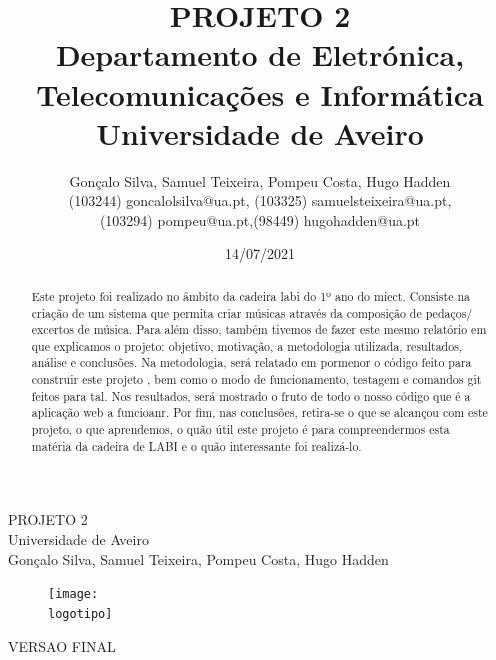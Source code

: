 \documentclass{report}
\begin{document}
%
\def\titulo{PROJETO 2}
\def\data{14/07/2021}
\def\autores{Gonçalo Silva, Samuel Teixeira, Pompeu Costa, Hugo Hadden}
\def\autorescontactos{(103244) goncalolsilva@ua.pt, (103325) samuelsteixeira@ua.pt,\\
 (103294) pompeu@ua.pt,(98449) hugohadden@ua.pt}
\def\versao{VERSAO FINAL}
\def\departamento{Departamento de Eletrónica, Telecomunicações e
Informática}
\def\empresa{Universidade de Aveiro}
\def\logotipo{ua.pdf}
%
%
\renewcommand{\contentsname}{Índice}
\begin{titlepage}

\begin{center}
%
\vspace*{50mm}
%
{\Huge \titulo}\\ 
%
\vspace{10mm}
%
{\Large \empresa}\\
%
\vspace{10mm}
%
{\LARGE \autores}\\ 
%
\vspace{30mm}
%
\begin{figure}[h]
\center
\texttt{[image: \\logotipo]}
\end{figure}
%
\vspace{30mm}
\end{center}
%
\begin{flushright}
\versao
\end{flushright}
\end{titlepage}

\title{%
{\Huge\textbf{\titulo}}\\
{\Large \departamento\\ \empresa}
}
%
\author{%
    \autores \\
    \autorescontactos
}
%
\date{\data}
%
\maketitle


\begin{abstract}
Este projeto foi realizado no âmbito da cadeira \ac{labi} do 1º ano do \ac{miect}. 
Consiste na criação de um sistema que permita criar músicas através da composição 
de pedaços/ excertos de música. Para além disso, também tivemos de fazer
este mesmo relatório em que explicamos o projeto: objetivo, motivação, a
metodologia utilizada, resultados, análise e conclusões.
Na metodologia, será relatado em pormenor o código feito para construir este projeto
, bem como o modo de funcionamento, testagem e comandos git feitos para tal.
Nos resultados, será mostrado o fruto de todo o nosso código que é a aplicação web a funcioanr.
Por fim, nas conclusões, retira-se o que se alcançou com este projeto, o que aprendemos,
o quão útil este projeto é para compreendermos esta matéria da cadeira de LABI e o 
quão interessante foi realizá-lo.
\end{abstract}
\end{document}
